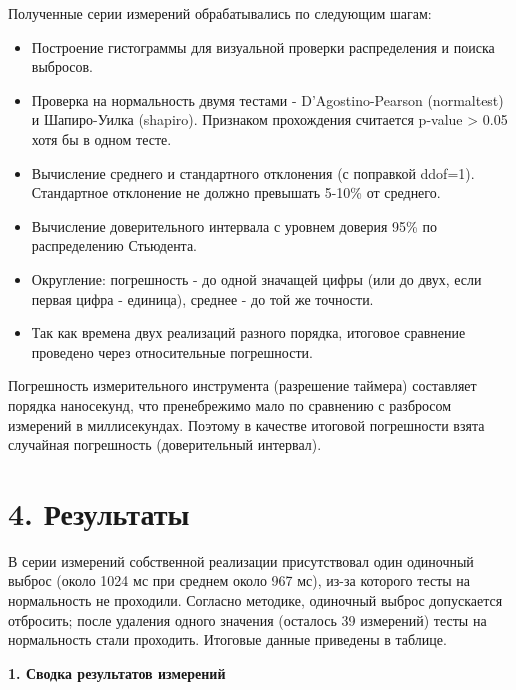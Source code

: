 \documentclass[12pt,a4paper]{article}
\begin{document}
Полученные серии измерений обрабатывались по следующим шагам:

\begin{itemize}
    \item Построение гистограммы для визуальной проверки распределения и поиска выбросов.
    \item Проверка на нормальность двумя тестами - D'Agostino-Pearson (normaltest) и Шапиро-Уилка (shapiro). Признаком прохождения считается p-value > 0.05 хотя бы в одном тесте.
    \item Вычисление среднего и стандартного отклонения (с поправкой ddof=1). Стандартное отклонение не должно превышать 5-10\% от среднего.
    \item Вычисление доверительного интервала с уровнем доверия 95\% по распределению Стьюдента.
    \item Округление: погрешность - до одной значащей цифры (или до двух, если первая цифра - единица), среднее - до той же точности.
    \item Так как времена двух реализаций разного порядка, итоговое сравнение проведено через относительные погрешности.
\end{itemize}

Погрешность измерительного инструмента (разрешение таймера) составляет порядка наносекунд, что пренебрежимо мало по сравнению с разбросом измерений в миллисекундах. Поэтому в качестве итоговой погрешности взята случайная погрешность (доверительный интервал).

\section*{4. Результаты}

В серии измерений собственной реализации присутствовал один одиночный выброс (около 1024 мс при среднем около 967 мс), из-за которого тесты на нормальность не проходили. Согласно методике, одиночный выброс допускается отбросить; после удаления одного значения (осталось 39 измерений) тесты на нормальность стали проходить. Итоговые данные приведены в таблице.

\textbf{1. Сводка результатов измерений}
\end{document}
